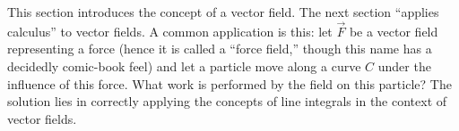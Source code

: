 This section introduces the concept of a vector field. The next section ``applies calculus'' to vector fields. A common application is this: let $\vec F$ be a vector field representing a force (hence it is called a ``force field,'' though this name has a decidedly comic-book feel) and let a particle move along a curve $C$ under the influence of this force. What work is performed by the field on this particle? The solution lies in correctly applying the concepts of line integrals in the context of vector fields.


